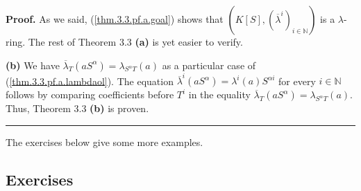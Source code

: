 \documentclass[numbers=enddot,12pt,final,onecolumn,notitlepage]{scrartcl}%
\newenvironment{proof}[1][Proof]{\noindent\textbf{#1.} }{\ \rule{0.5em}{0.5em}}
\begin{document}
\begin{proof}
As we said, (\ref{thm.3.3.pf.a.goal}) shows that $\left(  K\left[  S\right]
,\left(  \overline{\lambda}^{i}\right)  _{i\in\mathbb{N}}\right)  $ is a
$\lambda$-ring. The rest of Theorem 3.3 \textbf{(a)} is yet easier to verify.

\textbf{(b)} We have $\overline{\lambda}_{T}\left(  aS^{\alpha}\right)
=\lambda_{S^{\alpha}T}\left(  a\right)  $ as a particular case of
(\ref{thm.3.3.pf.a.lambdaol}). The equation $\overline{\lambda}^{i}\left(
aS^{\alpha}\right)  =\lambda^{i}\left(  a\right)  S^{\alpha i}$ for every
$i\in\mathbb{N}$ follows by comparing coefficients before $T^{i}$ in the
equality $\overline{\lambda}_{T}\left(  aS^{\alpha}\right)  =\lambda
_{S^{\alpha}T}\left(  a\right)  $. Thus, Theorem 3.3 \textbf{(b)} is proven.
\end{proof}

The exercises below give some more examples.

\subsection{Exercises}
\end{document}
